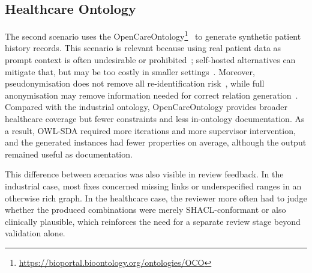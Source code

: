 \subsection{Healthcare Ontology}
The second scenario uses the OpenCareOntology\footnote{\url{https://bioportal.bioontology.org/ontologies/OCO}}~\cite{dutta_bain_oco_bioportal_2024} to generate synthetic patient history records. This scenario is relevant because using real patient data as prompt context is often undesirable or prohibited~\cite{vallevik2025processing,Kaabachi2025}; self-hosted alternatives can mitigate that, but may be too costly in smaller settings~\cite{potluri2026lois}. Moreover, pseudonymisation does not remove all re-identification risk~\cite{10.1371/journal.pone.0028071}, while full anonymisation may remove information needed for correct relation generation~\cite{Sarmin2025}. Compared with the industrial ontology, OpenCareOntology provides broader healthcare coverage but fewer constraints and less in-ontology documentation. As a result, OWL-SDA required more iterations and more supervisor intervention, and the generated instances had fewer properties on average, although the output remained useful as documentation.

This difference between scenarios was also visible in review feedback. In the industrial case, most fixes concerned missing links or underspecified ranges in an otherwise rich graph. In the healthcare case, the reviewer more often had to judge whether the produced combinations were merely SHACL-conformant or also clinically plausible, which reinforces the need for a separate review stage beyond validation alone.
